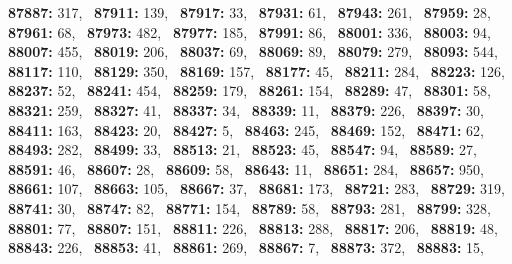 \textbf{87887:} 317,\allowbreak~ 
\textbf{87911:} 139,\allowbreak~ 
\textbf{87917:} 33,\allowbreak~ 
\textbf{87931:} 61,\allowbreak~ 
\textbf{87943:} 261,\allowbreak~ 
\textbf{87959:} 28,\allowbreak~ 
\textbf{87961:} 68,\allowbreak~ 
\textbf{87973:} 482,\allowbreak~ 
\textbf{87977:} 185,\allowbreak~ 
\textbf{87991:} 86,\allowbreak~ 
\textbf{88001:} 336,\allowbreak~ 
\textbf{88003:} 94,\allowbreak~ 
\textbf{88007:} 455,\allowbreak~ 
\textbf{88019:} 206,\allowbreak~ 
\textbf{88037:} 69,\allowbreak~ 
\textbf{88069:} 89,\allowbreak~ 
\textbf{88079:} 279,\allowbreak~ 
\textbf{88093:} 544,\allowbreak~ 
\textbf{88117:} 110,\allowbreak~ 
\textbf{88129:} 350,\allowbreak~ 
\textbf{88169:} 157,\allowbreak~ 
\textbf{88177:} 45,\allowbreak~ 
\textbf{88211:} 284,\allowbreak~ 
\textbf{88223:} 126,\allowbreak~ 
\textbf{88237:} 52,\allowbreak~ 
\textbf{88241:} 454,\allowbreak~ 
\textbf{88259:} 179,\allowbreak~ 
\textbf{88261:} 154,\allowbreak~ 
\textbf{88289:} 47,\allowbreak~ 
\textbf{88301:} 58,\allowbreak~ 
\textbf{88321:} 259,\allowbreak~ 
\textbf{88327:} 41,\allowbreak~ 
\textbf{88337:} 34,\allowbreak~ 
\textbf{88339:} 11,\allowbreak~ 
\textbf{88379:} 226,\allowbreak~ 
\textbf{88397:} 30,\allowbreak~ 
\textbf{88411:} 163,\allowbreak~ 
\textbf{88423:} 20,\allowbreak~ 
\textbf{88427:} 5,\allowbreak~ 
\textbf{88463:} 245,\allowbreak~ 
\textbf{88469:} 152,\allowbreak~ 
\textbf{88471:} 62,\allowbreak~ 
\textbf{88493:} 282,\allowbreak~ 
\textbf{88499:} 33,\allowbreak~ 
\textbf{88513:} 21,\allowbreak~ 
\textbf{88523:} 45,\allowbreak~ 
\textbf{88547:} 94,\allowbreak~ 
\textbf{88589:} 27,\allowbreak~ 
\textbf{88591:} 46,\allowbreak~ 
\textbf{88607:} 28,\allowbreak~ 
\textbf{88609:} 58,\allowbreak~ 
\textbf{88643:} 11,\allowbreak~ 
\textbf{88651:} 284,\allowbreak~ 
\textbf{88657:} 950,\allowbreak~ 
\textbf{88661:} 107,\allowbreak~ 
\textbf{88663:} 105,\allowbreak~ 
\textbf{88667:} 37,\allowbreak~ 
\textbf{88681:} 173,\allowbreak~ 
\textbf{88721:} 283,\allowbreak~ 
\textbf{88729:} 319,\allowbreak~ 
\textbf{88741:} 30,\allowbreak~ 
\textbf{88747:} 82,\allowbreak~ 
\textbf{88771:} 154,\allowbreak~ 
\textbf{88789:} 58,\allowbreak~ 
\textbf{88793:} 281,\allowbreak~ 
\textbf{88799:} 328,\allowbreak~ 
\textbf{88801:} 77,\allowbreak~ 
\textbf{88807:} 151,\allowbreak~ 
\textbf{88811:} 226,\allowbreak~ 
\textbf{88813:} 288,\allowbreak~ 
\textbf{88817:} 206,\allowbreak~ 
\textbf{88819:} 48,\allowbreak~ 
\textbf{88843:} 226,\allowbreak~ 
\textbf{88853:} 41,\allowbreak~ 
\textbf{88861:} 269,\allowbreak~ 
\textbf{88867:} 7,\allowbreak~ 
\textbf{88873:} 372,\allowbreak~ 
\textbf{88883:} 15,\allowbreak~ 
